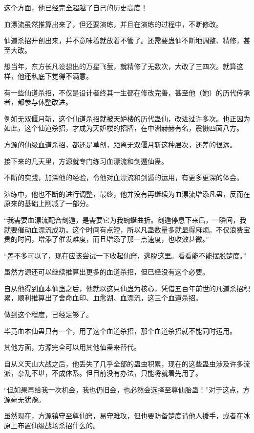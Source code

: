 \begin{this_body}
这个方面，他已经完全超越了自己的历史高度！

血漂流虽然推算出来了，但还要演练，并且在演练的过程中，不断修改。

仙道杀招开创出来，并不意味着就放着不管了。还需要蛊仙不断地调整、精修，甚至大改。

想当年，东方长凡设想出的万星飞萤，就精修了无数次，大改了三四次。就算这样，他还私底下觉得不满意。

有一些仙道杀招，不仅是设计者终其一生都在修改完善，甚至他（她）的历代传承者，都参与休整改进。

例如无双偃月斩，这个仙道杀招就被天妒楼的历代蛊仙，改进过许多次。也正因为如此，这个仙道杀招，才成为天妒楼的招牌，在中洲赫赫有名，震慑四面八方。

方源的仙级血道杀招，都还是草创，距离无双偃月斩这种层次，还差的很远。

接下来的几天里，方源就专门练习血漂流和剑遁仙蛊。

不断的实践，加深他的经验，令他对血漂流和剑遁的运用，有更多更深的体会。

演练中，他也不断的进行调整，最终，他并没有再继续为血漂流增添凡蛊，反而在原来的基础上削减了一部分。

“我需要血漂流配合剑遁，是需要它为我蜿蜒曲折。剑遁停息下来后，一瞬间，我就要催动血漂流成功。这个时间有点短，所以凡蛊数量多就显得麻烦。不仅浪费宝贵的时间，增添了催发难度，而且增添了那一点速度，也收效甚微。”

“差不多可以了，现在应该尝试一下收起仙窍，逃脱这里。看看能不能摆脱楚度。”

虽然方源还可以继续推算出更多的血道杀招，但已经没有这个必要。

自从他得到血本仙蛊之后，他就以这只仙蛊为核心，凭借五百年前世的凡道杀招积累，顺利推算出了舍命血印、血愈湖、血漂流，这三个血道杀招。

做到这个程度，已经足够了。

毕竟血本仙蛊只有一个，用了这个血道杀招，那个血道杀招就不能同时运用。

其他方面，方源完全可以用其他仙蛊来替代。

自从义天山大战之后，他丢失了几乎全部的蛊虫积累，现在的这些蛊虫涉及许多流派，杂乱不堪，不成体系。但目前没有办法，只能将就着先用了。

“但如果再给我一次机会，我也仍旧会，也必然会选择至尊仙胎蛊！”对于这点，方源毫无犹豫。

虽然现在，方源镇守至尊仙窍，易守难攻，但也要防备楚度请他人援手，或者在冰原上布置仙级战场杀招什么的。


\end{this_body}

